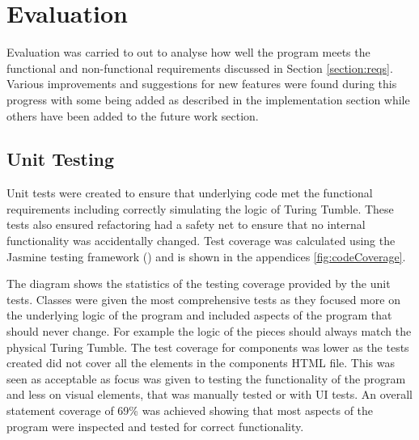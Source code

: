 \documentclass{l4proj}
\begin{document}
\chapter{Evaluation}
\label{section:evaluation}
Evaluation was carried to out to analyse how well the program meets the functional and non-functional requirements discussed in Section \ref{section:reqs}. Various improvements and suggestions for new features were found during this progress with some being added as described in the implementation section while others have been added to the future work section. 

\section{Unit Testing}
Unit tests were created to ensure that underlying code met the functional requirements including correctly simulating the logic of Turing Tumble. These tests also ensured refactoring had a safety net to ensure that no internal functionality was accidentally changed. Test coverage was calculated using the Jasmine testing framework (\cite{jasmine}) and is shown in the appendices \ref{fig:codeCoverage}. 

The diagram shows the statistics of the testing coverage provided by the unit tests. Classes were given the most comprehensive tests as they focused more on the underlying logic of the program and included aspects of the program that should never change. For example the logic of the pieces should always match the physical Turing Tumble. The test coverage for components was lower as the tests created did not cover all the elements in the components HTML file. This was seen as acceptable as focus was given to testing the functionality of the program and less on visual elements, that was manually tested or with UI tests. An overall statement coverage of 69\% was achieved showing that most aspects of the program were inspected and tested for correct functionality.
\end{document}
